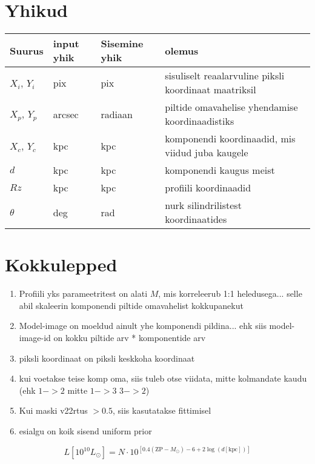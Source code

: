 \documentclass{article}
\begin{document}
	\section{Yhikud} %
	\label{sec:yhikud}
	\begin{tabular}{llll}
		Suurus & input yhik & Sisemine yhik & olemus\\
		\hline
		$X_i$, $Y_i$ & pix & pix & sisuliselt reaalarvuline piksli koordinaat maatriksil\\
		$X_p$, $Y_p$ & arcsec & radiaan & piltide omavahelise yhendamise koordinaadistiks\\
		$X_c$, $Y_c$ & kpc & kpc & komponendi koordinaadid, mis viidud juba kaugele\\
		$d$ & kpc & kpc & komponendi kaugus meist\\
		$Rz$ & kpc & kpc & profiili koordinaadid \\
		$\theta$ & deg & rad & nurk silindrilistest koordinaatides\\
	\end{tabular}
	
	
	
	
	\section{Kokkulepped} %
	\label{sec:kokkulepped}
	\begin{enumerate}
		\item Profiili yks parameetritest on alati $M$, mis korreleerub 1:1 heledusega... selle abil skaleerin komponendi piltide omavahelist kokkupanekut
		\item Model-image on moeldud ainult yhe komponendi pildina... ehk siis model-image-id on kokku piltide arv * komponentide arv
		\item piksli koordinaat on piksli keskkoha koordinaat
		\item kui voetakse teise komp oma, siis tuleb otse viidata, mitte kolmandate kaudu (ehk $1->2$ mitte $1->3$ $3->2$)
		\item Kui maski v22rtus $>0.5$, siis kasutatakse fittimisel
		\item esialgu on koik sisend uniform prior
	\end{enumerate}
	\begin{equation}
		L\left[ 10^{10}L_\odot \right] = N\cdot10^{\left[ 0.4(\mathrm{ZP}-M_\odot) -6 + 2\log(d[\mathrm{kpc}]) \right]}
	\end{equation}
	
\end{document}
